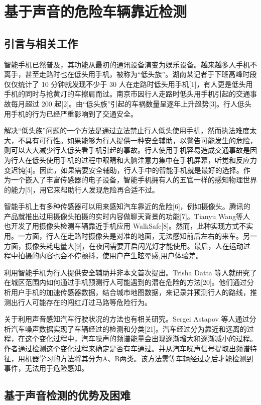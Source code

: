 \chapter{基于声音的危险车辆靠近检测}
\section{引言与相关工作}

智能手机已然普及，其功能从最初的通讯设备演变为娱乐设备。越来越多人手机不离手，甚至走路时也在低头用手机，被称为“低头族”。湖南某记者于下班高峰时段仅仅统计了 10 分钟就发现不少于 30 人在走路时低头用手机[1]，有人更是低头用手机的同时与抢黄灯的车擦肩而过。南京市因行人走路时低头用手机引起的交通事故每月超过 200 起[2]。由“低头族”引起的车祸数量呈逐年上升趋势[3]。行人低头用手机的行为已经严重影响到了交通安全。


解决“低头族”问题的一个方法是通过立法禁止行人低头使用手机，然而执法难度太大，不具有可行性。如果能够为行人提供一种安全辅助，以警告可能发生的危险，则可以大大减少行人低头看手机引起的事故。行人使用手机容易造成交通事故是因为行人在低头使用手机的过程中眼睛和大脑注意力集中在手机屏幕，听觉和反应力变迟钝[4]。因此，如果需要安全辅助，行人手中的智能手机就是最好的选择。作为一个嵌入了丰富传感器的电子设备，智能手机拥有人的五官一样的感知物理世界的能力[5]，用它来帮助行人发现危险再合适不过。


智能手机上有多种传感器可以用来感知汽车靠近的危险[6]，例如摄像头。腾讯的产品就推出过用摄像头拍摄的实时内容做聊天背景的功能[7]。Tianyu Wang等人也开发了用摄像头检测车辆靠近手机应用 WalkSafe[8]。然而，此种实现方式不实用。一方面，行人在走路时摄像头是对准的地面，无法感知前后左右的来车。另一方面，摄像头耗电量大[9]，在夜间需要开启闪光灯才能使用。最后，人在运动过程中拍摄的内容也会不停颤抖，使用户产生眩晕感,用户体验差。


利用智能手机为行人提供安全辅助并非本文首次提出。Trisha Datta 等人就研究了在城区范围内如何通过手机预测行人可能遇到的潜在危险的方法[20]。他们通过分析用户手机的加速传感器数据，结合城市地图数据，来记录并预测行人的路线，推测出行人可能存在的闯红灯过马路等危险行为。


关于利用声音感知汽车行驶状况的方法也有相关研究。Sergei Astapov 等人通过分析汽车噪声数据实现了车辆经过的检测和分类[21]。汽车经过分为靠近和远离的过程，在这个变化过程中，汽车噪声的频谱能量会出现逐渐增大和逐渐减小的过程。作者通过检测这个变化过程来确定是否有车通过。并从汽车噪声信号提取出频谱特征，用机器学习的方法将其分为A、B两类。该方法需等车辆经过之后才能检测到事件，无法用于危险感知。


\section{基于声音检测的优势及困难}

